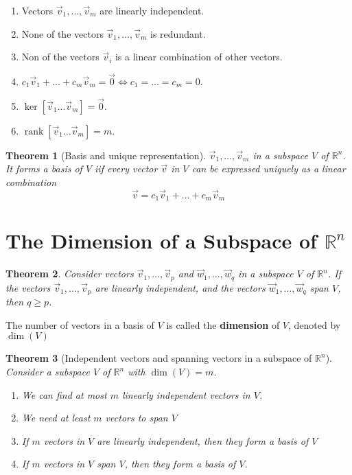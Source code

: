 \documentclass[letter]{article}
\newcommand{\R}{\mathbb{R}}
\newcommand{\rank}{\operatorname{rank}}
\newtheorem{theorem}{Theorem}[section]
\newenvironment{definition}[1][Definition]{\begin{trivlist}
\item[\hskip \labelsep {\bfseries #1}]}{\end{trivlist}}
\begin{document}
\begin{enumerate}
\item Vectors  $\vec v_1,\ldots, \vec v_m$ are linearly independent.
\item None of the vectors  $\vec v_1,\ldots, \vec v_m$ is redundant.
\item Non of the vectors $\vec v_i$ is a linear combination of other vectors.
\item $c_1\vec v_1 + \ldots+ c_m \vec v_m = \vec 0 \Leftrightarrow c_1=\ldots=c_m=0$.
\item $\ker [\vec v_1 \ldots \vec v_m] = \vec 0$.
\item $\rank [\vec v_1 \ldots \vec v_m] = m$.

\end{enumerate}
\begin{theorem}[Basis and unique representation]
$\vec v_1, \ldots, \vec v_m$ in a subspace $V$ of $\R^n$.
It forms a basis of $V$ iif every vector $\vec v$ in $V$ can be expressed uniquely as a linear combination
\[
\vec v = c_1 \vec v_1 + \ldots + c_m \vec v_m
\]
\end{theorem}

\section{The Dimension of a Subspace of $\R^n$}
\begin{theorem}
Consider vectors $\vec v_1, \ldots, \vec v_p$ and $\vec w_1, \ldots, \vec w_q$ in a subspace $V$ of $\R^n$. If the vectors $\vec v_1, \ldots, \vec v_p$ are linearly independent, and the vectors  $\vec w_1, \ldots, \vec w_q$ span $V$, then $q\geq p$.
\end{theorem}

\begin{definition}
The number of vectors in a basis of $V$ is called the \textbf{dimension} of $V$, denoted by $\dim(V)$
\end{definition}

\begin{theorem}[Independent vectors and spanning vectors in a subspace of $\R^n$]
Consider a subspace $V$ of $\R^n$ with $\dim(V) = m$.
\begin{enumerate}
\item We can find at most $m$ linearly independent vectors in $V$.
\item We need at least $m$ vectors to span $V$
\item If $m$ vectors in $V$ are linearly independent, then they form a basis of $V$
\item If $m$ vectors in $V$ span $V$, then they form a basis of $V$.
\end{enumerate}
\end{theorem}
\end{document}
